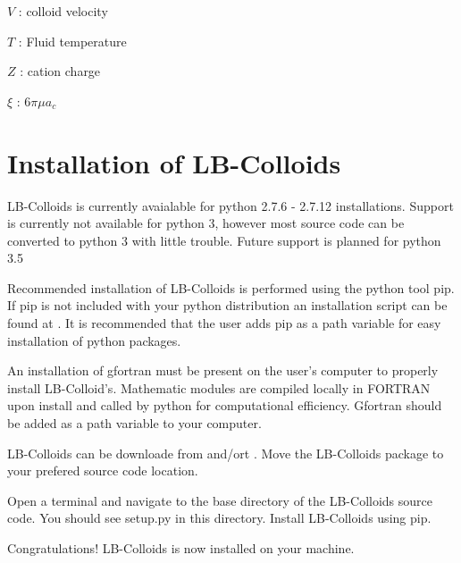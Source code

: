 \documentclass[letterpaper,10pt,english]{sphinxmanual}
\begin{document}
\(V\) : colloid velocity

\(T\) : Fluid temperature

\(Z\) : cation charge

\(\xi\) : \(6\pi \mu a_{c}\)


\chapter{Installation of LB-Colloids}
\label{\detokenize{index:installation-of-lb-colloids}}
LB-Colloids is currently avaialable for python 2.7.6 - 2.7.12 installations. Support is currently not available for python 3, however most source code can be converted to python 3 with little trouble. Future support is planned for python 3.5

Recommended installation of LB-Colloids is performed using the python tool pip. If pip is not included with your python distribution an installation script can be found at . It is recommended that the user adds pip as a path variable for easy installation of python packages.

An installation of gfortran must be present on the user’s computer to properly install LB-Colloid’s. Mathematic modules are compiled locally in FORTRAN upon install and called by python for computational efficiency. Gfortran should be added as a path variable to your computer.

LB-Colloids can be downloade from  and/ort . Move the LB-Colloids package to your prefered source code location.

Open a terminal and navigate to the base directory of the LB-Colloids source code. You should see setup.py in this directory. Install LB-Colloids using pip.

\begin{sphinxVerbatim}[commandchars=\\\{\}]
 
  
   
\end{sphinxVerbatim}

Congratulations! LB-Colloids is now installed on your machine.
\end{document}
